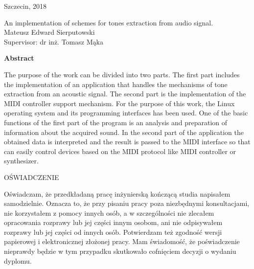 \begin{titlepage}
\begin{flushleft}
\end{flushleft}

\begin{center}
   \vspace{1.0 cm}
   {\large Szczecin, {2018}}
   \vfill                         %
\end{center}

\end{titlepage}

\pagebreak

\begin{titlepage}

\begin{center}
\vspace{2.cm}                   
\LARGE {An implementation of schemes for tones extraction from audio signal.} \\ 
\vspace{1cm}                   
\large {Mateusz Edward Sierputowski}\\
\large Supervisor: { dr inż. Tomasz Mąka}\\
\vspace{1cm}
\end{center}

\textbf{Abstract}
\vspace{12pt}
 
The purpose of the work can be divided into two parts. The first part
includes the implementation of an application that handles the mechanisms
of tone extraction from an acoustic signal. The second part is the
implementation of the MIDI controller support mechanism. For the purpose
of this work, the Linux operating system and its programming interfaces
has been used. One of the basic functions of the first part of the
program is an analysis and preparation of information about the acquired
sound. In the second part of the application the obtained data is
interpreted and the result is passed to the MIDI interface so that can
easily control devices based on the MIDI protocol like MIDI controller or
synthesizer.

\end{titlepage}

\pagebreak

\begin{center}
\large
\vspace{3 cm}
OŚWIADCZENIE 
\end{center} 
 
Oświadczam, że przedkładaną pracę inżynierską kończącą studia napisałem samodzielnie.
Oznacza to, że przy pisaniu pracy poza niezbędnymi konsultacjami, nie korzystałem z
pomocy innych osób, a w szczególności nie zlecałem opracowania rozprawy lub jej części 
innym osobom, ani nie odpisywałem rozprawy lub jej części od innych osób. Potwierdzam też
zgodność wersji papierowej i elektronicznej złożonej pracy. Mam świadomość, że poświadczenie nieprawdy
będzie w tym przypadku skutkowało cofnięciem decyzji o wydaniu dyplomu.  


\thispagestyle {empty}